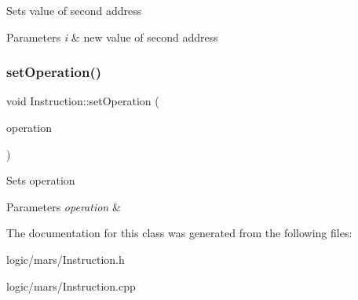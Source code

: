 Sets value of second address 
\begin{DoxyParams}{Parameters}
{\em i} & new value of second address \\
\hline
\end{DoxyParams}
\mbox{\label{classInstruction_a6c3579495382c92ec38816636d2e98ef}} 
\subsubsection{\texorpdfstring{set\+Operation()}{setOperation()}}
{\footnotesize\ttfamily void Instruction\+::set\+Operation (\begin{DoxyParamCaption}\item[{const std\+::shared\+\_\+ptr$<$ \hyperlink{classMarsOperation}{Mars\+Operation} $>$ \&}]{operation }\end{DoxyParamCaption})}

Sets operation 
\begin{DoxyParams}{Parameters}
{\em operation} & \\
\hline
\end{DoxyParams}


The documentation for this class was generated from the following files\+:\begin{DoxyCompactItemize}
\item 
logic/mars/Instruction.\+h\item 
logic/mars/Instruction.\+cpp\end{DoxyCompactItemize}
